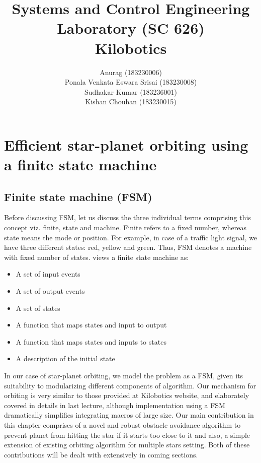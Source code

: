 \documentclass{report}[12pt]
\author{Anurag (183230006) \\ Ponala Venkata Eswara Srisai
(183230008)\\ Sudhakar Kumar (183236001)\\ Kishan Chouhan (183230015)}
\title{Systems and Control Engineering Laboratory (SC 626) \\ Kilobotics}
\begin{document}
\maketitle
\tableofcontents
\listoffigures
\thispagestyle{empty}
\mbox{}


\chapter{Efficient star-planet orbiting using a finite state machine}
\section{Finite state machine (FSM)}
Before discussing FSM, let us discuss the three individual terms comprising this concept viz. finite, state and machine. Finite refers to a fixed number, whereas state means the mode or position. For example, in case of a traffic light signal, we have three different states: red, yellow and green. Thus, FSM denotes a machine with fixed number of states. \cite{LL-GM-BS-rderts} views a finite state machine as:
\begin{itemize}
	\item A set of input events
	\item A set of output events
	\item A set of states
	\item A function that maps states and input to output
	\item A function that maps states and inputs to states
	\item A description of the initial state
\end{itemize}
\noindent In our case of star-planet orbiting, we model the problem as a FSM, given its suitability to modularizing different components of algorithm. Our mechanism for orbiting is very similar to those provided at Kilobotics website, and elaborately covered in details in last lecture, although implementation using a FSM dramatically simplifies integrating macros of large size. Our main contribution in this chapter comprises of a novel and robust obstacle avoidance algorithm to prevent planet from hitting the star if it starts too close to it and also, a simple extension of existing orbiting algorithm for multiple stars setting. Both of these contributions will be dealt with extensively in coming sections. 
\end{document}
